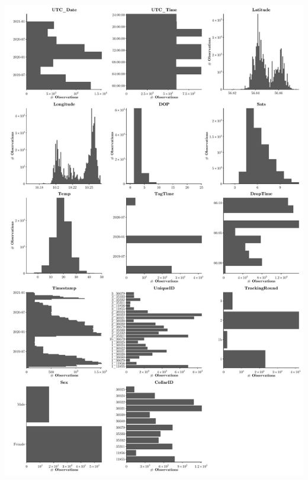 \documentclass[
]{article}
\begin{document}
\includegraphics{exploration_files/figure-latex/fig.de-1.pdf}
\end{document}
